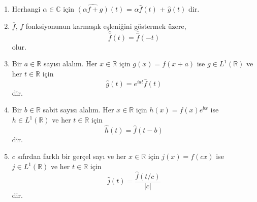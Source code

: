 \documentclass[a4paper, 9pt]{article}
\begin{document}
\begin{enumerate}
\item Herhangi $\alpha \in \mathbb{C}$ için $\widehat{(\alpha f+g)}(t)$ = $\alpha \widehat{f}(t)$ + $\widehat{g}(t)$ dir.
\item  $\overline{f}$, $f$ fonksiyonunun karmaşık eşleniğini göstermek üzere,
\[ \widehat{\overline{f}}(t) = \overline{\widehat{f}}(-t) \]
olur.
\item  Bir $a \in \mathbb{R}$  sayısı alalım. Her $x\in \mathbb{R}$  için $g(x)=f(x+a)$ ise $g\in L^1(\mathbb{R})$ ve her $t\in \mathbb{R}$ için 
\[ \widehat{g}(t) = e^{iat}\widehat{f}(t)\]
dir.
\item Bir $b\in \mathbb{R}$ sabit sayısı alalım. Her $x\in \mathbb{R}$ için $h(x)=f(x)e^{bx}$ ise $h\in L^1(\mathbb{R})$ ve her $t\in \mathbb{R}$ için
\[ \widehat{h}(t) = \widehat{f}(t-b) \]
dir.
\item $c$ sıfırdan farklı bir gerçel sayı ve her $x \in \mathbb{R}$ için $j(x)=f(cx)$ ise $j\in L^1(\mathbb{R})$ ve her $t\in \mathbb{R}$ için
\[ \widehat{j}(t)=\frac{\widehat{f}(t/c)}{\left |  c \right |} \] dir.

\end{enumerate}
\end{document}
